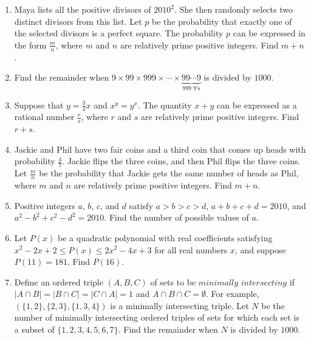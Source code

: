 \documentclass{article}
\begin{document}
\begin{enumerate}[label=\arabic*., itemsep=0.5em]
\item Maya lists all the positive divisors of \(2010^2\). She then randomly selects two distinct divisors from this list. Let \(p\) be the probability that exactly one of the selected divisors is a perfect square. The probability \(p\) can be expressed in the form \(\frac {m}{n}\), where \(m\) and \(n\) are relatively prime positive integers. Find \(m + n\).\par \vspace{0.5em}\item Find the remainder when \(9 \times 99 \times 999 \times \cdots \times \underbrace{99\cdots9}_{\text{999 9's}}\) is divided by \(1000\).\par \vspace{0.5em}\item Suppose that \(y = \frac34x\) and \(x^y = y^x\). The quantity \(x + y\) can be expressed as a rational number \(\frac {r}{s}\), where \(r\) and \(s\) are relatively prime positive integers. Find \(r + s\).\par \vspace{0.5em}\item Jackie and Phil have two fair coins and a third coin that comes up heads with probability \(\frac47\). Jackie flips the three coins, and then Phil flips the three coins. Let \(\frac {m}{n}\) be the probability that Jackie gets the same number of heads as Phil, where \(m\) and \(n\) are relatively prime positive integers. Find \(m + n\).\par \vspace{0.5em}\item Positive integers \(a\), \(b\), \(c\), and \(d\) satisfy \(a > b > c > d\), \(a + b + c + d = 2010\), and \(a^2 - b^2 + c^2 - d^2 = 2010\). Find the number of possible values of \(a\).\par \vspace{0.5em}\item Let \(P(x)\) be a quadratic polynomial with real coefficients satisfying \(x^2 - 2x + 2 \le P(x) \le 2x^2 - 4x + 3\) for all real  numbers \(x\), and suppose \(P(11) = 181\). Find \(P(16)\).\par \vspace{0.5em}\item Define an ordered triple \((A, B, C)\) of sets to be \(\textit{minimally intersecting}\) if \(|A \cap B| = |B \cap C| = |C \cap A| = 1\) and \(A \cap B \cap C = \emptyset\). For example, \((\{1,2\},\{2,3\},\{1,3,4\})\) is a minimally intersecting triple. Let \(N\) be the number of minimally intersecting ordered triples of sets for which each set is a subset of \(\{1,2,3,4,5,6,7\}\). Find the remainder when \(N\) is divided by \(1000\).


\end{enumerate}
\end{document}
